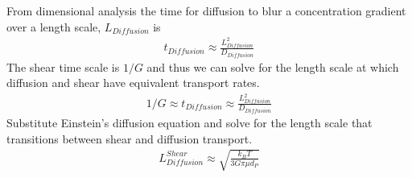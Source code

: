 \documentclass[letterpaper,10pt,english]{sphinxmanual}
\begin{document}
From dimensional analysis the time for diffusion to blur a concentration gradient over a length scale, \(L_{Diffusion}\) is
\begin{equation}\label{equation:Rapid_Mix/RM_Derivations:Rapid_Mix/RM_Derivations:47}
\begin{split}t_{Diffusion} \approx \frac{L_{Diffusion}^2}{D_{Diffusion}}\end{split}
\end{equation}
The shear time scale is \(1/G\) and thus we can solve for the length scale at which diffusion and shear have equivalent transport rates.
\begin{equation}\label{equation:Rapid_Mix/RM_Derivations:Rapid_Mix/RM_Derivations:48}
\begin{split}1/G \approx t_{Diffusion} \approx \frac{L_{Diffusion}^2}{D_{Diffusion}}\end{split}
\end{equation}
Substitute Einstein’s diffusion equation and solve for the length scale that transitions between shear and diffusion transport.
\begin{equation}\label{equation:Rapid_Mix/RM_Derivations:Rapid_Mix/RM_Derivations:49}
\begin{split}L_{Diffusion}^{Shear} \approx \sqrt{\frac{k_B T}{3 G \pi \mu  d_P}}\end{split}
\end{equation}
%
\begin{sphinxVerbatim}[commandchars=\\\{\}]
  
  
   
 
   
         

  
  
  
\end{sphinxVerbatim}
\end{document}
